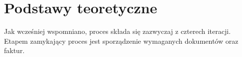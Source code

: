 
\chapter{Podstawy teoretyczne}






\vspace{1cm}
Jak wcześniej wspomniano, proces składa się zazwyczaj z czterech iteracji. Etapem zamykający proces jest sporządzenie wymaganych dokumentów oraz faktur.











